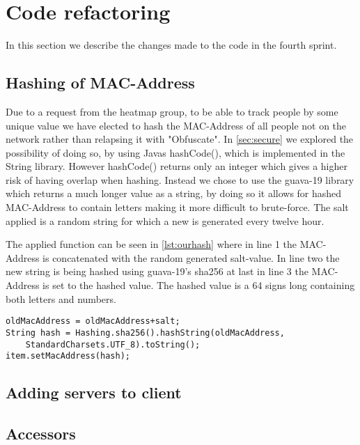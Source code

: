\section{Code refactoring}
In this section we describe the changes made to the code in the fourth sprint.

\subsection*{Hashing of MAC-Address}
Due to a request from the heatmap group, to be able to track people by some unique value we have elected to hash the MAC-Address of all people not on the network rather than relapsing it with "Obfuscate". In \cref{sec:secure} we explored the possibility of doing so, by using Javas hashCode(), which is implemented in the String library. However hashCode() returns only an integer which gives a higher risk of having overlap when hashing. Instead we chose to use the guava-19 library which returns a much longer value as a string, by doing so it allows for hashed MAC-Address to contain letters making it more difficult to brute-force. The salt applied is a random string for which a new is generated every twelve hour. 

The applied function can be seen in \cref{lst:ourhash} where in line 1 the MAC-Address is concatenated with the random generated salt-value. In line two the new string is being hashed using guava-19's sha256 at last in line 3 the MAC-Address is set to the hashed value. The hashed value is a 64 signs long containing both letters and numbers.

\begin{lstlisting}[caption={Hashing a MAC-Address},label={lst:ourhash},language=inc_Java]
oldMacAddress = oldMacAddress+salt;
String hash = Hashing.sha256().hashString(oldMacAddress, 
	StandardCharsets.UTF_8).toString();
item.setMacAddress(hash);
\end{lstlisting}

\subsection*{Adding servers to client}

\subsection*{Accessors}